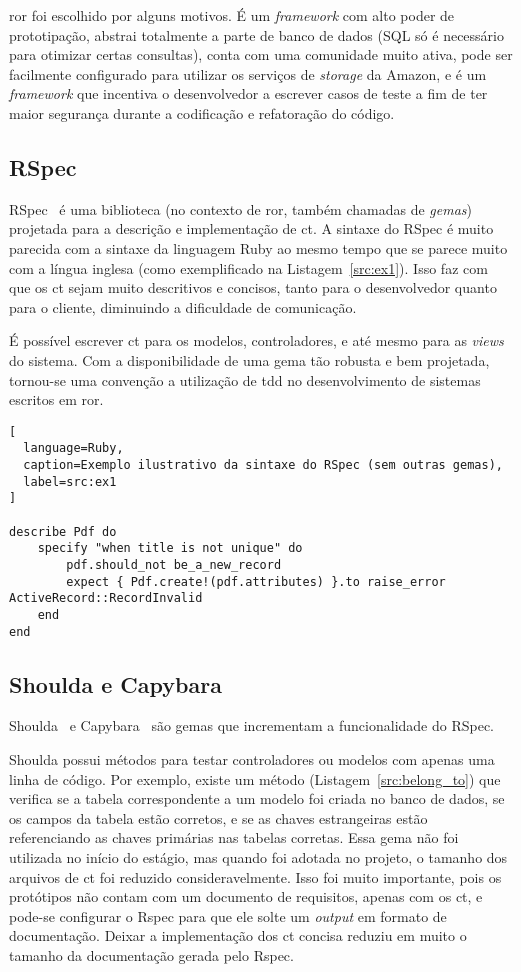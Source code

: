 \gls{ror} foi escolhido por alguns motivos. É um \textit{framework} com alto poder de prototipação, abstrai totalmente
a parte de banco de dados (SQL só é necessário para otimizar certas consultas), conta com uma comunidade muito ativa,
pode ser facilmente configurado para utilizar os serviços de \textit{storage} da Amazon, e é um \textit{framework} que
incentiva o desenvolvedor a escrever casos de teste a fim de ter maior segurança durante a codificação e refatoração do código.

\subsection{RSpec}

RSpec~\cite{RSpec} é uma biblioteca (no contexto de \gls{ror}, também chamadas de \textit{gemas}) projetada para a descrição e implementação de
\gls{ct}. A sintaxe do RSpec é muito parecida com a sintaxe da linguagem Ruby ao mesmo tempo que se parece muito com a língua inglesa
(como exemplificado na Listagem~\ref{src:ex1}).
Isso faz com que os \gls{ct} sejam muito descritivos e concisos, tanto para o desenvolvedor quanto para o cliente, diminuindo a dificuldade
de comunicação.

É possível escrever \gls{ct} para os modelos, controladores, e até mesmo para as \textit{views} do sistema. Com a disponibilidade de uma gema
tão robusta e bem projetada, tornou-se uma convenção a utilização de \gls{tdd} no desenvolvimento de sistemas escritos em \gls{ror}.

\begin{lstlisting}[
  language=Ruby,
  caption=Exemplo ilustrativo da sintaxe do RSpec (sem outras gemas),
  label=src:ex1
]

describe Pdf do
	specify "when title is not unique" do
		pdf.should_not be_a_new_record
		expect { Pdf.create!(pdf.attributes) }.to raise_error ActiveRecord::RecordInvalid
	end
end

\end{lstlisting}

\subsection{Shoulda e Capybara}

Shoulda~\cite{Shoulda} e Capybara~\cite{Capybara} são gemas que incrementam a funcionalidade do RSpec.

Shoulda possui métodos para testar controladores ou modelos com apenas uma linha de código. Por exemplo, existe um método (Listagem~\ref{src:belong_to})
que verifica se a tabela correspondente
a um modelo foi criada no banco de dados, se os campos da tabela estão corretos, e se as chaves estrangeiras estão referenciando as chaves primárias nas 
tabelas corretas. Essa gema não foi utilizada no início do estágio, mas quando foi adotada no projeto, o tamanho dos arquivos de \gls{ct} foi reduzido 
consideravelmente. Isso foi muito importante, pois os protótipos não contam com um documento de requisitos, apenas com os \gls{ct}, e pode-se 
configurar o Rspec para que ele solte um \textit{output} em formato de documentação. Deixar a implementação dos \gls{ct} concisa reduziu em muito 
o tamanho da documentação gerada pelo Rspec.


